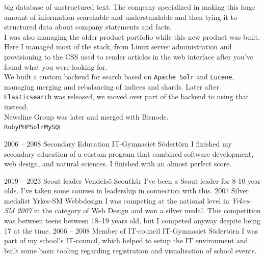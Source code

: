 \documentclass[9pt]{developercv} %
\begin{document}
\begin{entrylist}
{      big database of unstructured text. The company specialized in making this
      huge amount of information searchable and understandable and then tying
      it to structured data about company statements and facts.\\ I was also
      managing the older product portfolio while this new product was built.\\
      Here I managed most of the stack, from Linux server administration and
      provisioning to the CSS used to render articles in the web interface
      after you've found what you were looking for.\\ We built a custom backend
      for search based on \texttt{Apache Solr} and \texttt{Lucene}, managing
      merging and rebalancing of indices and shards. Later after
      \texttt{Elasticsearch} was released, we moved over part of the backend to
      using that instead.\\ Newsline Group was later and merged with Bisnode.\\
      \texttt{Ruby}\slashsep\texttt{PHP}\slashsep\texttt{Solr}\slashsep\texttt{MySQL}}
\end{entrylist}

\pagebreak



\begin{entrylist}
  \entry
    {2006 -- 2008}
    {Secondary Education}
    {IT-Gymnasiet Södertörn}
    {I finished my secondary education of a custom program that combined
      software development, web design, and natural sciences. I finished with
      an almost perfect score.}
\end{entrylist}



\begin{entrylist}
  \entry
    {2019 -- 2023}
    {Scout leader}
    {Vendelsö Scoutkår}
    {I've been a Scout leader for 8-10 year olds. I've taken some courses in
    leadership in connection with this.}
  \entry
    {2007}
    {Silver medalist}
    {Yrkes-SM Webbdesign}
    {I was competing at the national level in \textit{Yrkes-SM 2007} in the
      category of Web Design and won a silver medal. This competition was
      between teens between 18--19 years old, but I competed anyway despite
      being 17 at the time.}
  \entry
    {2006 -- 2008}
    {Member of IT-council}
    {IT-Gymnasiet Södertörn}
    {I was part of my school's IT-council, which helped to setup the IT
      environment and built some basic tooling regarding registration and
      visualisation of school events.}
\end{entrylist}
\end{document}
